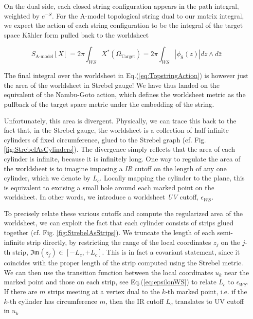 \documentclass[english]{article}
\renewcommand{\>}{\rangle}
\newcommand{\<}{\langle}
\renewcommand{\(}{\left(}
\renewcommand{\)}{\right)}
\begin{document}
On the dual side, each closed string configuration appears in the path integral, weighted by $e^{-S}$. For the A-model topological string dual to our matrix integral, we expect the action of each string configuration to be the integral of the target space Kähler form pulled back to the worldsheet 

\begin{equation} \label{eq:TopstringAction}
    S_{\text{A-model}}[X] = 2\pi \int_{WS} X^{*}(\Omega_{\text{Target}}) = 2\pi \int_{WS} |\phi_{\text{S}}(z)| dz \wedge d\bar{z}
\end{equation}

The final integral over the worldsheet in Eq.(\ref{eq:TopstringAction}) is however just the area of the worldsheet in Strebel gauge! We have thus landed on the equivalent of the Nambu-Goto action, which defines the worldsheet metric as the pullback of the target space metric under the embedding of the string.

Unfortunately, this area is divergent. Physically, we can trace this back to the fact that, in the Strebel gauge, the worldsheet is a collection of half-infinite cylinders of fixed circumference, glued to the Strebel graph (cf. Fig. \ref{fig:StrebelAsCylinders}). The divergence simply reflects that the area of each cylinder is infinite, because it is infinitely long. One way to regulate the area of the worldsheet is to imagine imposing a \textit{IR} cutoff on the length of any one cylinder, which we denote by $L_{c}$. Locally mapping the cylinder to the plane, this is equivalent to excising a small hole around each marked point on the worldsheet. In other words, we introduce a worldsheet \textit{UV} cutoff, $\epsilon_{WS}$.

To precisely relate these various cutoffs and compute the regularized area of the worldsheet, we can exploit the fact that each cylinder consists of strips glued together (cf. Fig. \ref{fig:StrebelAsStrips}). We truncate the length of each semi-infinite strip directly, by restricting the range of the local coordinates $z_{j}$ on the $j$-th strip, $\mathfrak{Im}(z_{j}) \in [ - L_{c},+L_{c} ]$. This is in fact a covariant statement, since it coincides with the proper length of the strip computed using the Strebel metric. We can then use the transition function between the local coordinates $u_{k}$ near the marked point and those on each strip, see Eq.(\ref{eq:epsilonWS}) to relate $L_{c}$ to $\epsilon_{WS}$. If there are $m$ strips meeting at a vertex dual to the $k$-th marked point, i.e. if the $k$-th cylinder has circumference $m$, then the IR cutoff $L_{c}$ translates to UV cutoff in $u_{k}$ 
\end{document}
